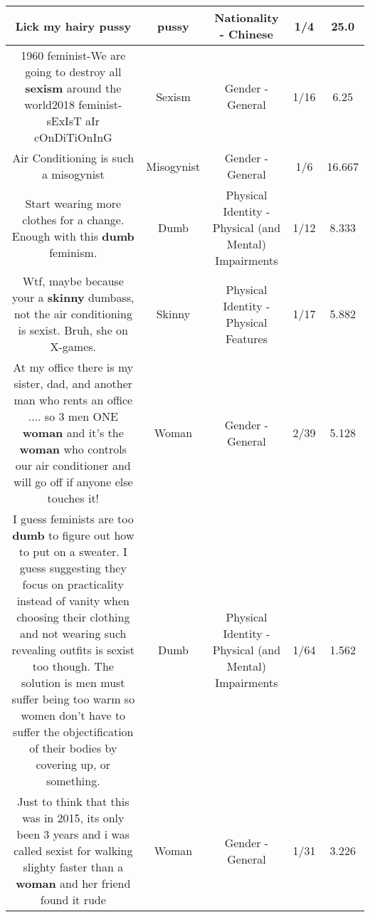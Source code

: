 \documentclass[11pt]{article}
\newlength\mylength
\begin{document}
\begin{center}
\begin{longtable}{|C{.65\mylength}|C{.30\mylength}|C{.12\mylength}|C{.12\mylength}|C{.12\mylength}|}
  \small Lick my hairy pussy\normalsize   & pussy & Nationality - Chinese & 1/4 & 25.0 \\  \hline
  \small 1960 feminist-We are going to destroy all \textbf{sexism} around the world2018 feminist- sExIsT aIr cOnDiTiOnInG\normalsize   & Sexism & Gender - General & 1/16 & 6.25 \\  \hline
  \small Air Conditioning is such a misogynist\normalsize   & Misogynist & Gender - General & 1/6 & 16.667 \\  \hline
  \small Start wearing more clothes for a change. Enough with this \textbf{dumb} feminism.\normalsize   & Dumb & Physical Identity - Physical (and Mental) Impairments & 1/12 & 8.333 \\  \hline
  \small Wtf, maybe because your a \textbf{skinny} dumbass, not the air conditioning is sexist. Bruh, she on X-games.\normalsize   & Skinny & Physical Identity - Physical Features & 1/17 & 5.882 \\  \hline
  \small At my office there is my sister, dad, and another man who rents an office .... so 3 men ONE \textbf{woman} and it's the \textbf{woman} who controls our air conditioner and will go off if anyone else touches it!\normalsize   & Woman & Gender - General & 2/39 & 5.128 \\  \hline
  \small I guess feminists are too \textbf{dumb} to figure out how to put on a sweater. I guess suggesting they focus on practicality instead of vanity when choosing their clothing and not wearing such revealing outfits is sexist too though. The solution is men must suffer being too warm so women don't have to suffer the objectification of their bodies by covering up, or something.\normalsize   & Dumb & Physical Identity - Physical (and Mental) Impairments & 1/64 & 1.562 \\  \hline
  \small Just to think that this was in 2015, its only been 3 years and i was called sexist for walking slighty faster than a \textbf{woman} and her friend found it rude\normalsize   & Woman & Gender - General & 1/31 & 3.226 \\  \hline

\end{longtable}
\end{center}
\end{document}
